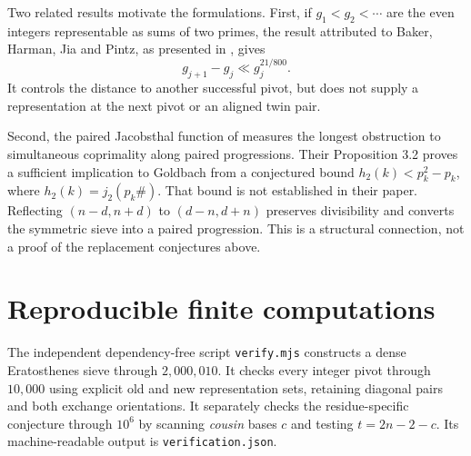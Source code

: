 \documentclass[11pt,a4paper]{article}
\theoremstyle{definition}
\theoremstyle{remark}
\begin{document}
Two related results motivate the formulations. First, if $g_1<g_2<\cdots$ are the even integers representable as sums of two primes, the result attributed to Baker, Harman, Jia and Pintz, as presented in \citet[Section 14]{Pintz2009}, gives
\[
 g_{j+1}-g_j\ll g_j^{21/800}.
\]
It controls the distance to another successful pivot, but does not supply a representation at the next pivot or an aligned twin pair.

Second, the paired Jacobsthal function of \citet{ZillerMorack2017} measures the longest obstruction to simultaneous coprimality along paired progressions. Their Proposition 3.2 proves a sufficient implication to Goldbach from a conjectured bound $h_2(k)<p_k^2-p_k$, where $h_2(k)=j_2(p_k\#)$. That bound is not established in their paper. Reflecting $(n-d,n+d)$ to $(d-n,d+n)$ preserves divisibility and converts the symmetric sieve into a paired progression. This is a structural connection, not a proof of the replacement conjectures above.

\section{Reproducible finite computations}\label{sec:experiment}
The independent dependency-free script \texttt{verify.mjs} constructs a
dense Eratosthenes sieve through $2{,}000{,}010$. It checks every integer
pivot through $10{,}000$ using explicit old and new representation sets,
retaining diagonal pairs and both exchange orientations. It separately
checks the residue-specific conjecture through $10^6$ by scanning
\emph{cousin} bases $c$ and testing $t=2n-2-c$. Its machine-readable
output is \texttt{verification.json}.
\end{document}
